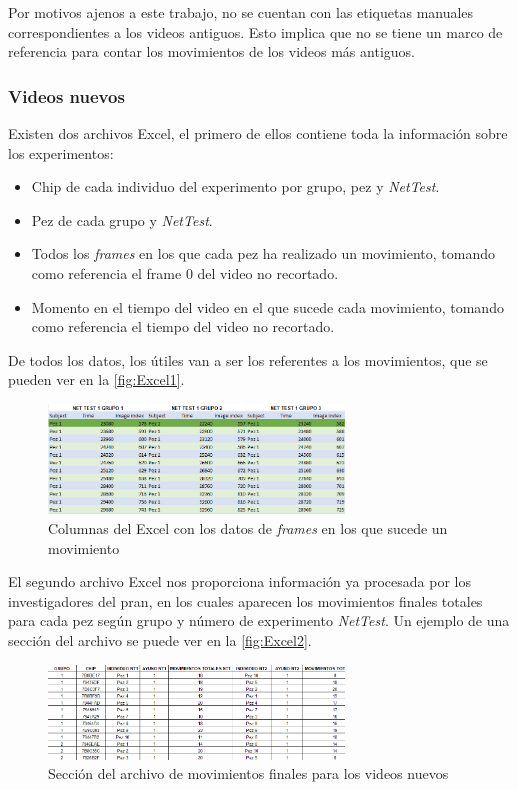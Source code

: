 Por motivos ajenos a este trabajo, no se cuentan con las etiquetas manuales correspondientes a los videos antiguos. Esto implica que no se tiene un marco de referencia para 
contar los movimientos de los videos más antiguos.

\subsubsection{Videos nuevos}

Existen dos archivos Excel, el primero de ellos contiene toda la información sobre los experimentos:
\begin{itemize}
    \item Chip de cada individuo del experimento por grupo, pez y \textit{NetTest}.
    \item Pez de cada grupo y \textit{NetTest}.
    \item Todos los \textit{frames} en los que cada pez ha realizado un movimiento, tomando como referencia el frame 0 del video no recortado.
    \item Momento en el tiempo del video en el que sucede cada movimiento, tomando como referencia el tiempo del video no recortado.
\end{itemize}

De todos los datos, los útiles van a ser los referentes a los movimientos, que se pueden ver en la \autoref{fig:Excel1}.

\begin{figure}[H]
    \centering
    \includegraphics[width=0.7\textwidth]{images/3/Excel1.png}
    \caption{Columnas del Excel con los datos de \textit{frames} en los que sucede un movimiento}
    \label{fig:Excel1}
\end{figure}
\clearpage
El segundo archivo Excel nos proporciona información ya procesada por los investigadores del \acrshort{pran}, en los cuales aparecen 
los movimientos finales totales para cada pez según grupo y número de experimento \textit{NetTest}. Un ejemplo de una sección del archivo se 
puede ver en la \autoref{fig:Excel2}.

\begin{figure}[H]
    \centering
    \includegraphics[width=0.7\textwidth]{images/3/Excel2.png}
    \caption{Sección del archivo de movimientos finales para los videos nuevos}
    \label{fig:Excel2}
\end{figure}

